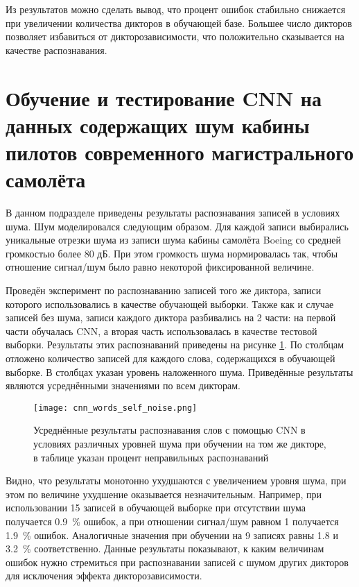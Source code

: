 Из результатов можно сделать вывод, что процент ошибок стабильно снижается при увеличении количества дикторов в обучающей базе.
Большее число дикторов позволяет избавиться от дикторозависимости, что положительно сказывается на качестве распознавания.

\clearpage


\section{Обучение и тестирование CNN на данных содержащих шум кабины пилотов современного магистрального самолёта} \label{sect4_4}

В данном подразделе приведены результаты распознавания записей в условиях шума.
Шум моделировался следующим образом.
Для каждой записи выбирались уникальные отрезки шума из записи шума кабины самолёта Boeing со средней громкостью более 80 дБ.
При этом громкость шума нормировалась так, чтобы отношение сигнал/шум было равно некоторой фиксированной величине.

Проведён эксперимент по распознаванию записей того же диктора, записи которого использовались в качестве обучающей выборки.
Также как и случае записей без шума, записи каждого диктора разбивались на 2 части: на первой части обучалась CNN, а вторая часть использовалась в качестве тестовой выборки.
Результаты этих распознаваний приведены на рисунке \ref{fig:cnn_words_self_noise}.
По столбцам отложено количество записей для каждого слова, содержащихся в обучающей выборке.
В столбцах указан уровень наложенного шума.
Приведённые результаты являются усреднёнными значениями по всем дикторам.

\begin{figure}[h]
	\centering
	\texttt{[image: cnn\_words\_self\_noise.png]}
	\caption{Усреднённые результаты распознавания слов с помощью CNN в условиях различных уровней шума при обучении на том же дикторе, в таблице указан процент неправильных распознаваний}
	\label{fig:cnn_words_self_noise}
\end{figure}

Видно, что результаты монотонно ухудшаются с увеличением уровня шума, при этом по величине ухудшение оказывается незначительным.
Например, при использовании 15 записей в обучающей выборке при отсутствии шума получается 0.9~\% ошибок, а при отношении сигнал/шум равном 1 получается 1.9~\% ошибок.
Аналогичные значения при обучении на 9 записях равны 1.8 и 3.2~\% соответственно.
Данные результаты показывают, к каким величинам ошибок нужно стремиться при распознавании записей с шумом других дикторов для исключения эффекта дикторозависимости.

